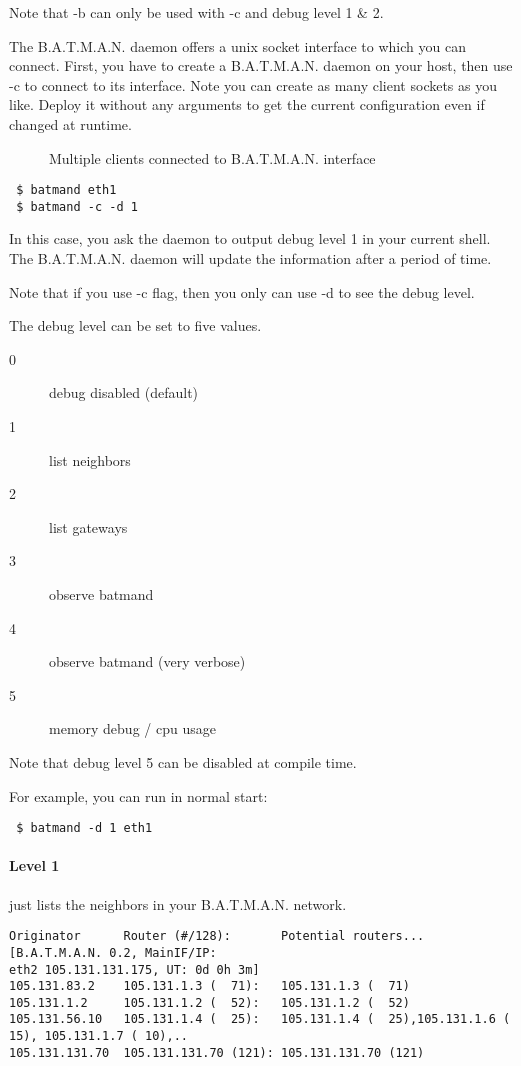 Note that -b can only be used with -c and debug level 1 \& 2.

The B.A.T.M.A.N. daemon offers a unix socket interface to which you can connect.
First, you have to create a B.A.T.M.A.N. daemon on your host, then use -c to
connect to its interface. Note you can create as many client sockets as you
like.
Deploy it without any arguments to get the current configuration even if changed
at runtime.

\begin{figure}[h]
 \begin{center}
  
 \end{center}
  \caption{Multiple clients connected to B.A.T.M.A.N. interface}
\end{figure}

\begin{verbatim}
 $ batmand eth1
 $ batmand -c -d 1
\end{verbatim}
In this case, you ask the daemon to output debug level 1 in your current shell.
The B.A.T.M.A.N. daemon will update the information after a period of time.

Note that if you use -c flag, then you only can use -d to see the debug level.

The debug level can be set to five values.

\begin{description}
 \item[0] debug disabled (default)
 \item[1] list neighbors
 \item[2] list gateways
 \item[3] observe batmand
 \item[4] observe batmand (very verbose)
 \item[5] memory debug / cpu usage
\end{description}
Note that debug level 5 can be disabled at compile time.

For example, you can run in normal start:
\begin{verbatim}
 $ batmand -d 1 eth1
\end{verbatim}

\paragraph*{Level 1}
just lists the neighbors in your B.A.T.M.A.N. network.

\begin{lstlisting}[basicstyle=\footnotesize,	frame=single, columns= flexible]
Originator      Router (#/128):       Potential routers... [B.A.T.M.A.N. 0.2, MainIF/IP:
eth2 105.131.131.175, UT: 0d 0h 3m]
105.131.83.2    105.131.1.3 (  71):   105.131.1.3 (  71)
105.131.1.2     105.131.1.2 (  52):   105.131.1.2 (  52)
105.131.56.10   105.131.1.4 (  25):   105.131.1.4 (  25),105.131.1.6 ( 15), 105.131.1.7 ( 10),..
105.131.131.70  105.131.131.70 (121): 105.131.131.70 (121)
\end{lstlisting}

